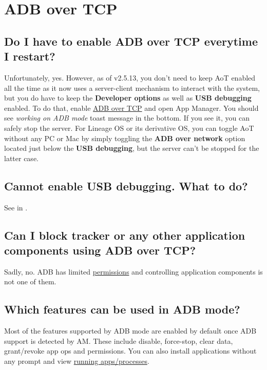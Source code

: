 \section{ADB over TCP}\label{sec:faq:adb-over-tcp} %

\subsection{Do I have to enable ADB over TCP everytime I restart?} %
Unfortunately, yes. However, as of v2.5.13, you don't need to keep AoT enabled all the time as it now uses a
server-client mechanism to interact with the system, but you do have to keep the \textbf{Developer options} as well as
\textbf{USB debugging} enabled. To do that, enable \hyperref[sec:adb-over-tcp]{ADB over TCP} and open App Manager. You
should see \textit{working on ADB mode} toast message in the bottom. If you see it, you can safely stop the server. For
Lineage OS or its derivative OS, you can toggle AoT without any PC or Mac by simply toggling the \textbf{ADB over
network} option located just below the \textbf{USB debugging}, but the server can't be stopped for the latter case.

\subsection{Cannot enable USB debugging. What to do?} %
See  in .

\subsection{Can I block tracker or any other application components using ADB over TCP?} %
Sadly, no. ADB has limited \href{https://github.com/aosp-mirror/platform_frameworks_base/blob/master/packages/Shell/AndroidManifest.xml}{permissions}
and controlling application components is not one of them.

\subsection{Which features can be used in ADB mode?} %
Most of the features supported by ADB mode are enabled by default once ADB support is detected by AM. These include
disable, force-stop, clear data, grant/revoke app ops and permissions. You can also install applications without any
prompt and view \hyperref[subsubsec:main:running-apps]{running apps/processes}.
